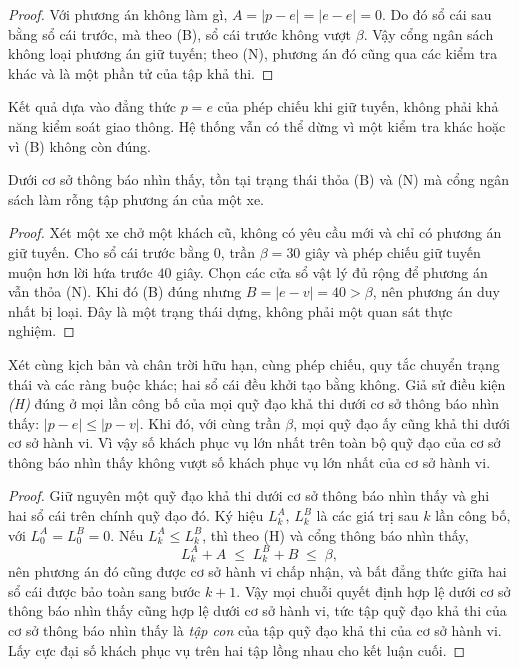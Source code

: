 \begin{proof}
Với phương án không làm gì, $A = |p - e| = |e - e| = 0$. Do đó sổ cái sau bằng sổ cái trước,
mà theo (B), sổ cái trước không vượt $\beta$. Vậy cổng ngân sách không loại phương án giữ
tuyến; theo (N), phương án đó cũng qua các kiểm tra khác và là một phần tử của tập khả thi.
\end{proof}

Kết quả dựa vào đẳng thức $p=e$ của phép chiếu khi giữ tuyến, không phải khả năng kiểm soát
giao thông. Hệ thống vẫn có thể dừng vì một kiểm tra khác hoặc vì (B) không còn đúng.

\begin{dinhly}

Dưới cơ sở thông báo nhìn thấy, tồn tại trạng thái thỏa (B) và (N) mà cổng ngân sách làm rỗng tập
phương án của một xe.
\end{dinhly}

\begin{proof}
Xét một xe chở một khách cũ, không có yêu cầu mới và chỉ có phương án giữ tuyến. Cho sổ cái
trước bằng $0$, trần $\beta=30$ giây và phép chiếu giữ tuyến muộn hơn lời hứa trước $40$ giây.
Chọn các cửa sổ vật lý đủ rộng để phương án vẫn thỏa (N). Khi đó (B) đúng nhưng
$B=|e-v|=40>\beta$, nên phương án duy nhất bị loại. Đây là một trạng thái dựng, không phải
một quan sát thực nghiệm.
\end{proof}

\begin{dinhly}
\label{dl:tapcon}
Xét cùng kịch bản và chân trời hữu hạn, cùng phép chiếu, quy tắc chuyển trạng thái và các
ràng buộc khác; hai sổ cái đều khởi tạo bằng không. Giả sử điều kiện \emph{(H)} đúng ở mọi
lần công bố của mọi quỹ đạo khả thi dưới cơ sở thông báo nhìn thấy:
$|p-e|\le|p-v|$. Khi đó, với cùng trần $\beta$, mọi quỹ đạo ấy cũng khả thi dưới cơ sở
hành vi. Vì vậy số khách phục vụ lớn nhất trên toàn bộ quỹ đạo của cơ sở thông báo nhìn thấy không
vượt số khách phục vụ lớn nhất của cơ sở hành vi.
\end{dinhly}

\begin{proof}
Giữ nguyên một quỹ đạo khả thi dưới cơ sở thông báo nhìn thấy và ghi hai sổ cái trên chính quỹ đạo đó.
Ký hiệu $L^{A}_k$, $L^{B}_k$ là các giá trị sau $k$ lần công bố, với
$L^{A}_0=L^{B}_0=0$. Nếu $L^{A}_k\le L^{B}_k$, thì theo (H) và cổng thông báo nhìn thấy,
$$L^{A}_k + A \;\le\; L^{B}_k + B \;\le\; \beta,$$
nên phương án đó cũng được cơ sở hành vi chấp nhận, và bất đẳng thức giữa hai sổ cái được bảo
toàn sang bước $k+1$. Vậy mọi chuỗi quyết định hợp lệ dưới cơ sở thông báo nhìn thấy cũng hợp lệ dưới cơ sở
hành vi, tức tập quỹ đạo khả thi của cơ sở thông báo nhìn thấy là \emph{tập con} của tập quỹ đạo khả thi của
cơ sở hành vi. Lấy cực đại số khách phục vụ trên hai tập lồng nhau cho kết luận cuối.
\end{proof}

